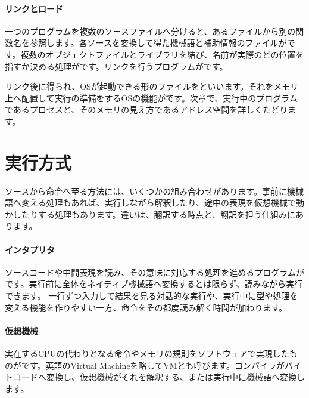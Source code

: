 \par
\endgroup
\medskip
\begingroup
\paragraph{リンクとロード}
        一つのプログラムを複数のソースファイルへ分けると、あるファイルから別の関数名を参照します。各ソースを変換して得た機械語と補助情報のファイルがです。複数のオブジェクトファイルとライブラリを結び、名前が実際のどの位置を指すか決める処理がです。リンクを行うプログラムがです。

        リンク後に得られ、OSが起動できる形のファイルをといいます。それをメモリ上へ配置して実行の準備をするOSの機能がです。次章で、実行中のプログラムであるプロセスと、そのメモリの見え方であるアドレス空間を詳しくたどります。

\par
\endgroup
\par
\endgroup


\section{実行方式}
\label{sec:02-language-05}

ソースから命令へ至る方法には、いくつかの組み合わせがあります。事前に機械語へ変える処理もあれば、実行しながら解釈したり、途中の表現を仮想機械で動かしたりする処理もあります。違いは、翻訳する時点と、翻訳を担う仕組みにあります。

\begingroup
\begingroup
\paragraph{インタプリタ}
        ソースコードや中間表現を読み、その意味に対応する処理を進めるプログラムがです。実行前に全体をネイティブ機械語へ変換するとは限らず、読みながら実行できます。
        一行ずつ入力して結果を見る対話的な実行や、実行中に型や処理を変える機能を作りやすい一方、命令をその都度読み解く時間が加わります。

\paragraph{仮想機械}
        実在するCPUの代わりとなる命令やメモリの規則をソフトウェアで実現したものがです。英語のVirtual Machineを略してVMとも呼びます。コンパイラがバイトコードへ変換し、仮想機械がそれを解釈する、または実行中に機械語へ変換します。

